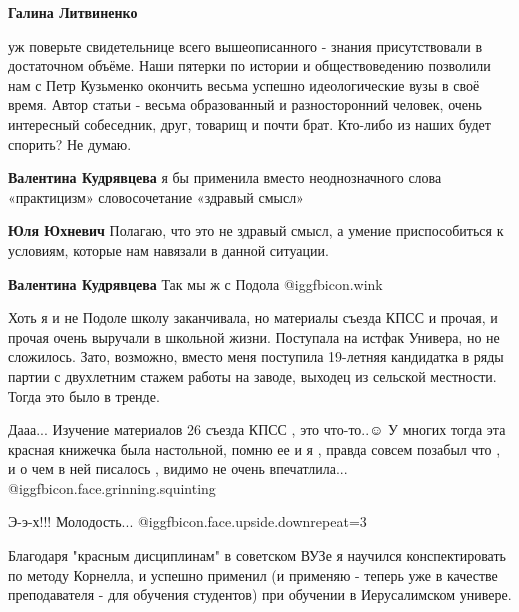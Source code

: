 \begin{itemize}
\begin{itemize}
\begin{itemize}
\textbf{Галина Литвиненко} 

уж поверьте свидетельнице всего вышеописанного - знания присутствовали в
достаточном объёме. Наши пятерки по истории и обществоведению позволили нам с
Петр Кузьменко окончить весьма успешно идеологические вузы в своё время. Автор
статьи - весьма образованный и разносторонний человек, очень интересный
собеседник, друг, товарищ и почти брат. Кто-либо из наших будет спорить? Не
думаю.

\end{itemize} %

\textbf{Валентина Кудрявцева} я бы применила вместо неоднозначного слова «практицизм» словосочетание «здравый смысл»

\begin{itemize} %
\textbf{Юля Юхневич} Полагаю, что это не здравый смысл, а умение приспособиться к условиям, которые нам навязали в данной ситуации.

\textbf{Валентина Кудрявцева} Так мы ж с Подола @igg{fbicon.wink} 
\end{itemize} %

\end{itemize} %


Хоть я и не Подоле школу заканчивала, но материалы съезда КПСС и прочая, и
прочая очень выручали в школьной жизни. Поступала на истфак Универа, но не
сложилось. Зато, возможно, вместо меня поступила 19-летняя кандидатка в ряды
партии с двухлетним стажем работы на заводе, выходец из сельской местности.
Тогда это было в тренде.


Дааа... Изучение материалов 26 съезда КПСС , это что-то..☺ У многих тогда эта
красная книжечка была настольной, помню ее и я , правда совсем позабыл что , и
о чем в ней писалось , видимо не очень впечатлила... @igg{fbicon.face.grinning.squinting} 


Э-э-х!!! Молодость... @igg{fbicon.face.upside.down}{repeat=3} 


Благодаря "красным дисциплинам" в советском ВУЗе я научился конспектировать по
методу Корнелла, и успешно применил (и применяю - теперь уже в качестве
преподавателя - для обучения студентов) при обучении в Иерусалимском универе.



\end{itemize}
